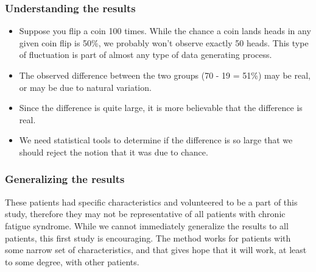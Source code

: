 
\begin{frame}
\frametitle{Understanding the results}


\pause

\begin{itemize}

\item Suppose you flip a coin 100 times. While the chance a coin lands heads in any given coin flip is 50\%, we probably won't observe exactly 50 heads. This type of fluctuation is part of almost any type of data generating process.

\item The observed difference between the two groups (70 - 19 = 51\%) may be real, or may be due to natural variation.

\item Since the difference is quite large, it is more believable that the difference is real.

\item We need statistical tools to determine if the difference is so large that we should reject the notion that it was due to chance.

\end{itemize}

\end{frame}


\begin{frame}
\frametitle{Generalizing the results}


\pause

These patients had specific characteristics and volunteered to be a part of this study, therefore they may not be representative of all patients with chronic fatigue syndrome. While we cannot immediately generalize the results to all patients, this first study is encouraging. The method works for patients with some narrow set of characteristics, and that gives hope that it will work, at least to some degree, with other patients.


\end{frame}

